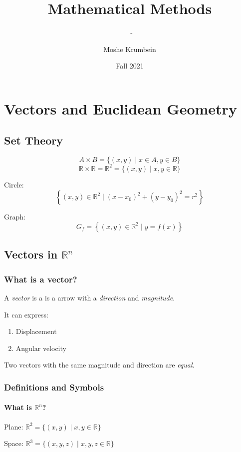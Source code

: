 \documentclass[00_complete]{subfiles}
\title{Mathematical Methods}
\author{Moshe Krumbein}
\date{Fall 2021}
\begin{document}
\setcounter{chapter}{0}

\chapter{Vectors and Euclidean Geometry}
\subtitle{\theauthor~- \thedate}

\section{Set Theory}

$$A \times B = \{(x,y) \;|\; x \in A, y \in B\}$$
$$\mathbb{R} \times \mathbb{R} = \mathbb{R}^2 = \{(x,y)\;|\;x,y \in \mathbb{R}\}$$

Circle:
$$\left\{(x,y) \in \mathbb{R}^2 \;|\; (x-x_0)^2 + (y-y_0)^2 = r^2\right\}$$

Graph:
$$G_f = \left\{(x,y) \in \mathbb{R}^2 \;|\; y=f(x)\right\}$$

\section{Vectors in \texorpdfstring{$\mathbb{R}^n$}{Rn}}

\subsection{What is a vector?}

A \emph{vector} is a is a arrow with a \emph{direction} and \emph{magnitude}.

It can express:
\begin{enumerate}
    \item Displacement
    \item Angular velocity
\end{enumerate}

Two vectors with the same magnitude and direction are \emph{equal}.
\subsection{Definitions and Symbols}

\subsubsection{What is \texorpdfstring{$\mathbb{R}^n$}{Rn}?}

Plane: $\mathbb{R}^2=\{(x,y)\;|\;x,y \in \mathbb{R}\}$

Space: $\mathbb{R}^3=\{(x,y,z)\;|\;x,y,z \in \mathbb{R}\}$
\end{document}
